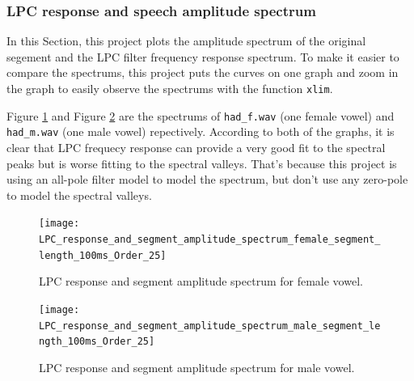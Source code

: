 \documentclass{article}
\begin{document}
\subsubsection{LPC response and speech amplitude spectrum}

In this Section, this project plots the amplitude spectrum of the original segement and the LPC filter frequency response spectrum. To make it easier to compare the spectrums, this project puts the curves on one graph and zoom in the graph to easily observe the spectrums with the function \verb+xlim+. 

Figure \ref{fig:response-spectrum-female} and Figure \ref{fig:response-spectrum-male} are the spectrums of \verb+had_f.wav+ (one female vowel) and \verb+had_m.wav+ (one male vowel) repectively. According to both of the graphs, it is clear that LPC frequecy response can provide a very good fit to the spectral peaks but is worse fitting to the spectral valleys. That's because this project is using an all-pole filter model to model the spectrum, but don't use any zero-pole to model the spectral valleys\citep{EEEM030}. 

\begin{figure}[h]
\begin{center}
\texttt{[image: LPC\_response\_and\_segment\_amplitude\_spectrum\_female\_segment\_length\_100ms\_Order\_25]}
\end{center}
\caption{\label{fig:response-spectrum-female} LPC response and segment amplitude spectrum for female vowel.}
\end{figure}

\begin{figure}[h]
\begin{center}
\texttt{[image: LPC\_response\_and\_segment\_amplitude\_spectrum\_male\_segment\_length\_100ms\_Order\_25]}
\end{center}
\caption{\label{fig:response-spectrum-male} LPC response and segment amplitude spectrum for male vowel.}
\end{figure}

\end{document}
